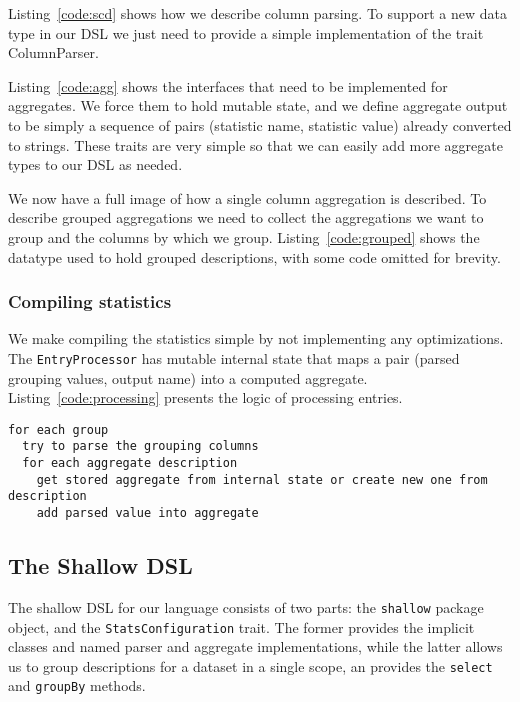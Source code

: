 Listing~\ref{code:scd} shows how we describe column parsing. To support a new data type in our DSL we just need to provide a simple implementation of the trait ColumnParser.

Listing~\ref{code:agg} shows the interfaces that need to be implemented for aggregates. We force them to hold mutable state, and we define aggregate output to be simply a sequence of pairs (statistic name, statistic value) already converted to strings. These traits are very simple so that we can easily add more aggregate types to our DSL as needed.

We now have a full image of how a single column aggregation is described. To describe grouped aggregations we need to collect the aggregations we want to group and the columns by which we group. Listing~\ref{code:grouped} shows the datatype used to hold grouped descriptions, with some code omitted for brevity.

\subsubsection{Compiling statistics}
We make compiling the statistics simple by not implementing any optimizations. The \texttt{EntryProcessor} has mutable internal state that maps a pair (parsed grouping values, output name) into a computed aggregate. Listing~\ref{code:processing} presents the logic of processing entries.

\begin{lstlisting}[caption=Processing entries, label=code:processing,float,floatplacement=H]
for each group
  try to parse the grouping columns
  for each aggregate description
    get stored aggregate from internal state or create new one from description
    add parsed value into aggregate
\end{lstlisting}

\subsection{The Shallow DSL}

The shallow DSL for our language consists of two parts: the \texttt{shallow} package object, and the \texttt{StatsConfiguration} trait. The former provides the implicit classes and named parser and aggregate implementations, while the latter allows us to group descriptions for a dataset in a single scope, an provides the  \texttt{select} and \texttt{groupBy} methods.

